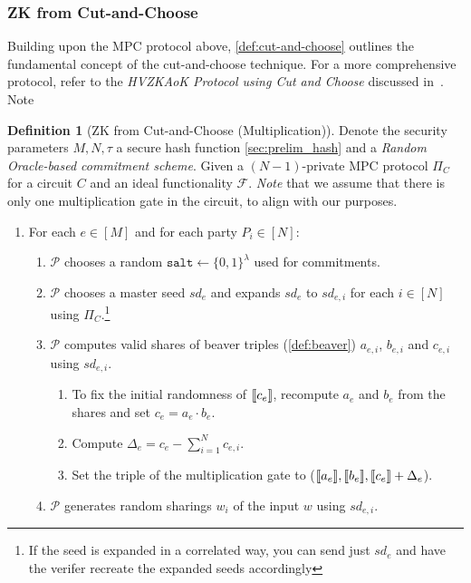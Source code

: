 \documentclass[twoside,11pt]{report}
\theoremstyle{definition}
\newtheorem{definition}{Definition}[section]
\theoremstyle{plain}
\begin{document}
\subsubsection{ZK from Cut-and-Choose}\label{sec:zk-cut-and-choose}

Building upon the MPC protocol above, \autoref{def:cut-and-choose} outlines the fundamental concept of the cut-and-choose technique. For a more comprehensive protocol, refer to the \textit{HVZKAoK Protocol using Cut and Choose} discussed in~\cite{baum2020concretely}. Note

\begin{definition}[ZK from Cut-and-Choose (Multiplication)]\label{def:cut-and-choose}
  Denote the security parameters $M, N, \tau$ a secure hash function \autoref{sec:prelim_hash} and a \textit{Random Oracle-based commitment scheme}. Given a $(N-1)$-private MPC protocol $\Pi_C$ for a circuit $C$ and an ideal functionality $\mathcal{F}$. \textit{Note} that we assume that there is only one multiplication gate in the circuit, to align with our purposes.
  \begin{enumerate}[itemsep=0pt, parsep=0pt]
    \item\label{itm:cut-choose-r1} For each $e \in [M]$ and for each party $P_i \in [N]$:
    \begin{enumerate}[nolistsep]
      \item $\mathcal{P}$ chooses a random $\texttt{salt} \leftarrow \{0,1\}^\lambda$ used for commitments.
      \item $\mathcal{P}$ chooses a master seed $sd_e$ and  expands $sd_e$ to $sd_{e,i}$ for each $i \in [N]$ using $\Pi_C$.\footnote{If the seed is expanded in a correlated way, you can send just $sd_e$ and have the verifer recreate the expanded seeds accordingly}
      \item $\mathcal{P}$ computes valid shares of beaver triples (\autoref{def:beaver}) $a_{e,i}$, $b_{e, i}$ and $c_{e,i}$ using $sd_{e,i}$.
            \begin{enumerate}
              \item To fix the initial randomness of $\llbracket c_e \rrbracket$, recompute $a_e$ and $b_e$ from the shares and set $c_e = a_e \cdot b_e$.
              \item Compute $\Delta_e = c_e - \sum_{i=1}^N c_{e,i}$.
              \item Set the triple of the multiplication gate to ($\llbracket a_e \rrbracket, \llbracket b_e \rrbracket, \llbracket c_e \rrbracket + \Delta_e$).
            \end{enumerate}
      \item $\mathcal{P}$ generates random sharings $w_i$ of the input $w$ using $sd_{e,i}$.

\end{enumerate}
\end{enumerate}
\end{definition}
\end{document}
